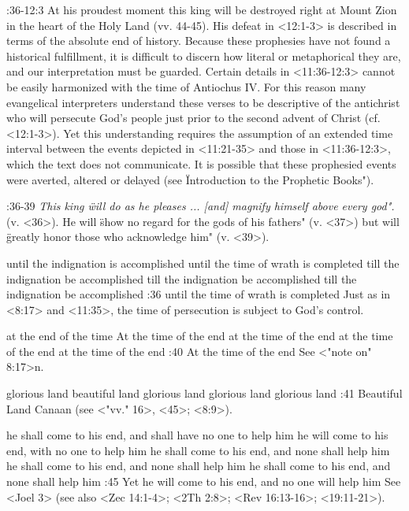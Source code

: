 :36-12:3 {} {At his proudest moment this king will be destroyed right at Mount Zion in the heart of the Holy Land} (vv. 44-45).
His  defeat in <12:1-3> is described in terms of the absolute end of history. Because these prophesies have
not found a historical fulfillment, it is difficult to discern how literal or metaphorical they are, 
and our interpretation must be guarded. Certain details in <11:36-12:3> cannot be easily harmonized
with the time of Antiochus IV.  For this reason many evangelical interpreters understand these 
verses to be descriptive of the antichrist who will persecute God's people just prior to the second advent of Christ (cf. <12:1-3>). Yet 
this understanding requires the assumption of an extended time interval between the events depicted in <11:21-35> and those in 
<11:36-12:3>, which the text does not communicate. It is possible that these prophesied events were averted, altered or delayed (see 
 \"Introduction to the Prophetic Books").

    :36-39 {} {\it This king \"will do as he pleases ... [and] magnify himself above every god".}\/ (v. <36>). He
will \"show no regard for the gods  of his fathers" (v. <37>) but will \"greatly honor those who acknowledge him" (v. <39>).



    {until the indignation is accomplished} %
    {until the time of wrath is completed} %
    {till the indignation be accomplished} %
    {till the indignation be accomplished} %
    {till the indignation be accomplished} %
:36 {until the time of wrath is completed} Just as in <8:17> and <11:35>, the time of persecution is subject to God's control. 


    {at the end of the time} %
    {At the time of the end} %
    {at the time of the end} %
    {at the time of the end} %
    {at the time of the end} %
:40 {At the time of the end} See <"note on" 8:17>n. 

    {glorious land} %
    {beautiful land} %
    {glorious land} %
    {glorious land} %
    {glorious land} %
:41 {Beautiful Land} Canaan (see <"vv." 16>, <45>; <8:9>).

    {he shall come to his end, and shall have no one to help him} %
    {he will come to his end, with no one to help him} %
    {he shall come to his end, and none shall help him} %
    {he shall come to his end, and none shall help him} %
    {he shall come to his end, and none shall help him} %
:45 {Yet he will come to his end, and no one will help him} See <Joel 3> (see also <Zec 14:1-4>;
 <2Th 2:8>; <Rev 16:13-16>; <19:11-21>).


